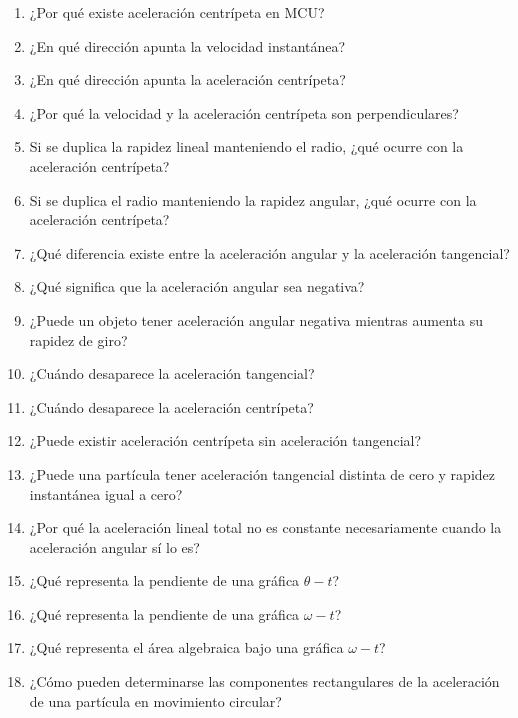\begin{enumerate}
    \item ¿Por qué existe aceleración centrípeta en MCU?

    \item ¿En qué dirección apunta la velocidad instantánea?

    \item ¿En qué dirección apunta la aceleración centrípeta?

    \item ¿Por qué la velocidad y la aceleración centrípeta son
    perpendiculares?

    \item Si se duplica la rapidez lineal manteniendo el radio, ¿qué ocurre
    con la aceleración centrípeta?

    \item Si se duplica el radio manteniendo la rapidez angular, ¿qué ocurre
    con la aceleración centrípeta?

    \item ¿Qué diferencia existe entre la aceleración angular y la
    aceleración tangencial?

    \item ¿Qué significa que la aceleración angular sea negativa?

    \item ¿Puede un objeto tener aceleración angular negativa mientras
    aumenta su rapidez de giro?

    \item ¿Cuándo desaparece la aceleración tangencial?

    \item ¿Cuándo desaparece la aceleración centrípeta?

    \item ¿Puede existir aceleración centrípeta sin aceleración tangencial?

    \item ¿Puede una partícula tener aceleración tangencial distinta de cero
    y rapidez instantánea igual a cero?

    \item ¿Por qué la aceleración lineal total no es constante
    necesariamente cuando la aceleración angular sí lo es?

    \item ¿Qué representa la pendiente de una gráfica \(\theta-t\)?

    \item ¿Qué representa la pendiente de una gráfica \(\omega-t\)?

    \item ¿Qué representa el área algebraica bajo una gráfica
    \(\omega-t\)?

    \item ¿Cómo pueden determinarse las componentes rectangulares de la
    aceleración de una partícula en movimiento circular?

\end{enumerate}



